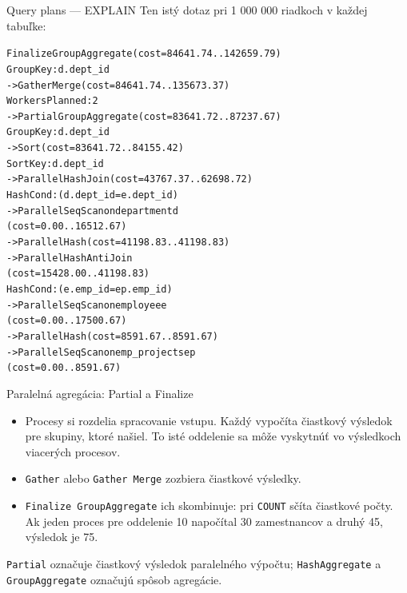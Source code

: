 \documentclass[12pt]{beamer}
\begin{document}
\begin{frame}[fragile]{Query plans --- EXPLAIN}
\vspace*{6mm}
{\small Ten istý dotaz pri 1 000 000 riadkoch v každej tabuľke:}
\tiny
\begin{alltt}
Finalize GroupAggregate  (cost=84641.74..142659.79)
  Group Key: d.dept_id
  ->  Gather Merge  (cost=84641.74..135673.37)
        Workers Planned: 2
        ->  Partial GroupAggregate  (cost=83641.72..87237.67)
              Group Key: d.dept_id
              ->  Sort  (cost=83641.72..84155.42)
                    Sort Key: d.dept_id
                    ->  Parallel Hash Join  (cost=43767.37..62698.72)
                          Hash Cond: (d.dept_id = e.dept_id)
                          ->  Parallel Seq Scan on department d
                              (cost=0.00..16512.67)
                          ->  Parallel Hash  (cost=41198.83..41198.83)
                                ->  \alert{Parallel Hash Anti Join}
                                    (cost=15428.00..41198.83)
                                      Hash Cond: (e.emp_id = ep.emp_id)
                                      ->  Parallel Seq Scan on employee e
                                          (cost=0.00..17500.67)
                                      ->  Parallel Hash  (cost=8591.67..8591.67)
                                            ->  Parallel Seq Scan on emp_projects ep
                                                (cost=0.00..8591.67)
\end{alltt}
\end{frame}

\begin{frame}[fragile]{Paralelná agregácia: Partial a Finalize}
\begin{itemize}
\item Procesy si rozdelia spracovanie vstupu.
Každý vypočíta čiastkový výsledok pre skupiny, ktoré našiel.
To isté oddelenie sa môže vyskytnúť vo výsledkoch viacerých procesov.
\item \verb|Gather| alebo \verb|Gather Merge| zozbiera čiastkové výsledky.
\item \verb|Finalize GroupAggregate| ich skombinuje:
pri \verb|COUNT| sčíta čiastkové počty.
Ak jeden proces pre oddelenie 10 napočítal 30 zamestnancov a druhý 45, výsledok je 75.
\end{itemize}
\medskip
\verb|Partial| označuje čiastkový výsledok paralelného výpočtu;
\verb|HashAggregate| a \verb|GroupAggregate| označujú spôsob agregácie.
\end{frame}
\end{document}
